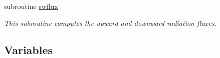 {\bf }\par
\begin{DoxyCompactItemize}
\item 
subroutine \hyperlink{namespacemodule__radsw__main_a138ee8c91089737c432cf70dbd8a8fae}{swflux}                                                                                               
\begin{DoxyCompactList}\small\item\em This subroutine computes the upward and downward radiation fluxes. \end{DoxyCompactList}\end{DoxyCompactItemize}

\subsection*{Variables}
